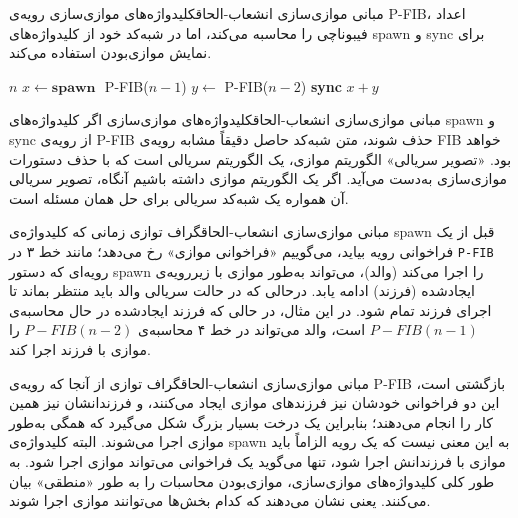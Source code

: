 \begin{itemframe-s}{مبانی موازی‌سازی انشعاب-الحاق}{کلیدواژه‌های موازی‌سازی}
\itm
رویه‌ی P-FIB، اعداد فیبوناچی را محاسبه می‌کند، اما در شبه‌کد خود از کلیدواژه‌های spawn و sync برای نمایش موازی‌بودن استفاده می‌کند.
\begin{algorithm}[H]\alglr
\caption{P-FIB}
\begin{algorithmic}[1]
    \State \Return $n$
\Else
    \State $x \gets \textbf{spawn }$ P-FIB($n-1$) 
    \State $y \gets$ P-FIB($n-2$) 
    \State \textbf{sync} 
    \State \Return $x+y$
\EndIf
\end{algorithmic}
\end{algorithm}
\end{itemframe-s}


\begin{itemframe-s}{مبانی موازی‌سازی انشعاب-الحاق}{کلیدواژه‌های موازی‌سازی}
\itm
اگر کلیدواژه‌های spawn و sync از رویه‌ی P-FIB حذف شوند، متن شبه‌کد حاصل دقیقاً مشابه رویه‌ی FIB خواهد بود.
\itm
«تصویر سریالی»
الگوریتم موازی، یک الگوریتم سریالی‌ است که با حذف دستورات موازی‌سازی به‌دست می‌آید.
\itm
اگر یک الگوریتم موازی داشته باشیم آنگاه، تصویر سریالی آن همواره یک شبه‌کد سریالی برای حل همان مسئله است.
\end{itemframe-s}


\begin{itemframe-s}{مبانی موازی‌سازی انشعاب-الحاق}{گراف توازی}
\itm
زمانی که کلیدواژه‌ی spawn قبل از یک فراخوانی رویه بیاید، می‌گوییم «فراخوانی موازی»
رخ می‌دهد؛ مانند خط ۳ در
\texttt{P-FIB}
\itm
رویه‌ای که دستور spawn را اجرا می‌کند (والد)، می‌تواند به‌طور موازی با زیررویه‌ی ایجادشده (فرزند) ادامه یابد. درحالی که در حالت سریالی والد باید منتظر بماند تا اجرای فرزند تمام شود.
\itm
در این مثال، در حالی که فرزند ایجادشده در حال محاسبه‌ی
$P-FIB(n - 1)$
است، والد می‌تواند در خط ۴ محاسبه‌ی
$P-FIB(n - 2)$
را موازی با فرزند اجرا کند.
\end{itemframe-s}


\begin{itemframe-s}{مبانی موازی‌سازی انشعاب-الحاق}{گراف توازی}
\itm
از آنجا که رویه‌ی P-FIB بازگشتی است، این دو فراخوانی خودشان نیز فرزندهای موازی ایجاد می‌کنند، و فرزندانشان نیز همین کار را انجام می‌دهند؛ بنابراین یک درخت بسیار بزرگ شکل می‌گیرد که همگی به‌طور موازی اجرا می‌شوند.
\itm
البته کلیدواژه‌ی spawn به این معنی نیست که یک رویه الزاماً باید موازی با فرزندانش اجرا شود، تنها می‌گوید یک فراخوانی می‌تواند موازی اجرا شود.
\itm
به طور کلی کلیدواژه‌های موازی‌سازی، موازی‌بودن محاسبات را به طور «منطقی»
بیان می‌کنند.
یعنی نشان می‌دهند که کدام بخش‌ها می‌توانند موازی اجرا شوند.

\end{itemframe-s}


